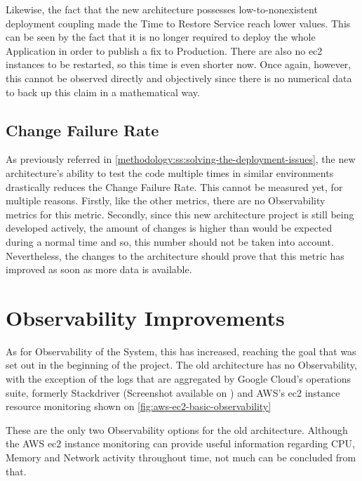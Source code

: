 Likewise, the fact that the new architecture possesses low-to-nonexistent deployment coupling made the Time to Restore Service reach lower values. This can be seen by the fact that it is no longer required to deploy the whole Application in order to publish a fix to Production. There are also no \gls{ec2} instances to be restarted, so this time is even shorter now. Once again, however, this cannot be observed directly and objectively since there is no numerical data to back up this claim in a mathematical way.

\subsection{Change Failure Rate}\label{results-and-discussion:ss:change-failure-rate}

As previously referred in \cref{methodology:ss:solving-the-deployment-issues}, the new architecture's ability to test the code multiple times in similar environments drastically reduces the Change Failure Rate. This cannot be measured yet, for multiple reasons. Firstly, like the other metrics, there are no Observability metrics for this metric. Secondly, since this new architecture project is still being developed actively, the amount of changes is higher than would be expected during a normal time and so, this number should not be taken into account.
Nevertheless, the changes to the architecture should prove that this metric has improved as soon as more data is available.


\section{Observability Improvements}\label{results-and-discussion:ss:observability-improvements}

As for Observability of the System, this has increased, reaching the goal that was set out in the beginning of the project.
The old architecture has no Observability, with the exception of the logs that are aggregated by Google Cloud's operations suite, formerly Stackdriver (Screenshot available on ) and AWS's \gls{ec2} instance resource monitoring shown on \cref{fig:aws-ec2-basic-observability}



These are the only two Observability options for the old architecture. Although the AWS \gls{ec2} instance monitoring can provide useful information regarding CPU, Memory and Network activity throughout time, not much can be concluded from that.

